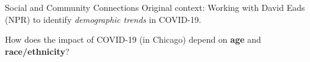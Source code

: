 \begin{slide}{Social and Community Connections}
	{\large Original context:} Working with David Eads (NPR) to identify \textit{demographic trends} in COVID-19. \\
	
	\vspace{.2cm}
	
	How does the impact of COVID-19 (in Chicago) depend on \textbf{age} and \textbf{race/ethnicity}?
\end{slide}